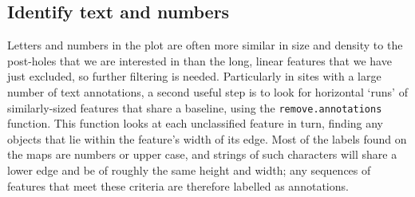 \documentclass[10pt,fleqn]{article}
\begin{document}

\subsection{Identify text and numbers}
Letters and numbers in the plot are often more similar in size and density to the post-holes that we are interested in than the long, linear features that we have just excluded, so further filtering is needed. Particularly in sites with a large number of text annotations, a second useful step is to look for horizontal `runs' of similarly-sized features that share a baseline, using the \texttt{remove.annotations} function. This function looks at each unclassified feature in turn, finding any objects that lie within the feature's width of its edge. Most of the labels found on the maps are numbers or upper case, and strings of such characters will share a lower edge and be of roughly the same height and width; any sequences of features that meet these criteria are therefore labelled as annotations.%


\end{document}
